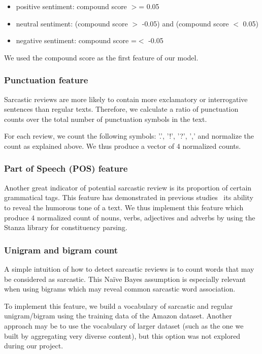 \documentclass[10pt,twocolumn,letterpaper]{article}
\begin{document}
\begin{itemize}
    \item positive sentiment: compound score $>$= 0.05
    \item neutral sentiment: (compound score $>$ -0.05) and (compound score $<$ 0.05)
    \item negative sentiment: compound score =$<$ -0.05
\end{itemize}

We used the compound score as the first feature of our model.

\subsubsection{Punctuation feature}

Sarcastic reviews are more likely to contain more exclamatory or interrogative sentences than regular texts.
Therefore, we calculate a ratio of punctuation counts over the total number of punctuation symbols in the text.

For each review, we count the following symbols: '.', '!', '?', ',' and normalize the count as explained above.
We thus produce a vector of 4 normalized counts.

\subsubsection{Part of Speech (POS) feature}

Another great indicator of potential sarcastic review is its proportion of certain grammatical tags.
This feature has demonstrated in previous studies~\cite{jain2019} its ability to reveal the humorous tone of a text.
We thus implement this feature which produce 4 normalized count of nouns, verbs, adjectives and adverbs by using the Stanza library for constituency parsing.

\subsubsection{Unigram and bigram count}

A simple intuition of how to detect sarcastic reviews is to count words that may be considered as sarcastic.
This Naïve Bayes assumption is especially relevant when using bigrams which may reveal common sarcastic word association.

To implement this feature, we build a vocabulary of sarcastic and regular unigram/bigram using the training data of the Amazon dataset.
Another approach may  be to use the vocabulary of larger dataset (such as the one we built by aggregating very diverse content), but this option was not explored during our project.
\end{document}
